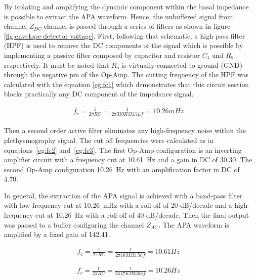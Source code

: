 By isolating and amplifying the dynamic component within the basal impedance is possible to extract the APA waveform. Hence, the unbuffered signal from channel $Z_{DC}$ channel is passed through a series of filters as shown in figure \ref{fig:envelope detector voltage}. First, following that schematic, a high pass filter (HPF) is used to remove the DC components of the signal which is possible by implementing a passive filter composed by capacitor and resistor  $C_4$ and $R_5$ respectively. It must be noted that $R_5$ is virtually connected to ground (GND) through the negative pin of the Op-Amp. The cutting frequency of the HPF was calculated with the equation \ref{eg:fc1} which demonstrates that this circuit section blocks practically any DC component of the impedance signal. 

\begin{align}
\label{eg:fc1}
f_c = \frac{1}{2 \pi R C} = \frac{1}{2 \pi 330K\Omega 4.7\mu f}=10.26 mHz
\end{align}

Then a second order active filter eliminates any high-frequency noise within the plethysmography signal. The cut off frequencies were calculated as in equations~\ref{eg:fc2} and~\ref{eg:fc3}. The first Op-Amp configuration is an inverting amplifier circuit with a frequency cut at \SI{10.61}{\hertz} and a gain in DC of \num{30.30}. The second Op-Amp configuration \SI{10.26}{\hertz} with an amplification factor in DC of \num{4.70}. 

In general, the extraction of the APA signal is achieved with a band-pass filter with low-frequency cut at \SI{10.26}{\milli\hertz} with a roll-off of \num{20} dB/decade and a high-frequency cut at \SI{10.26}{\hertz} with a roll-off of \num{40} dB/decade. Then the final output was passed to a buffer configuring the channel $Z_{AC}$. The APA waveform is amplified by a fixed gain of \num{142.41}. 

\begin{align}
\label{eg:fc2}
f_c = \frac{1}{2 \pi R C} = \frac{1}{2 \pi 10M\Omega 1.5 nf}=10.61Hz
\end{align}

\begin{align}
\label{eg:fc3}
f_c = \frac{1}{2 \pi R C} = \frac{1}{2 \pi 47K\Omega 330nf}=10.26Hz
\end{align}

